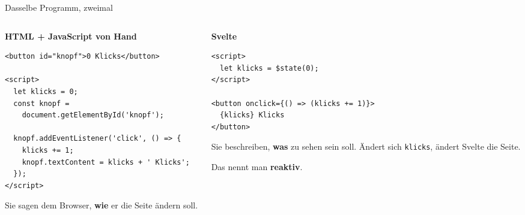 \begin{frame}[fragile]{Dasselbe Programm, zweimal}
  \begin{columns}[onlytextwidth,t]
    \begin{column}{0.49\textwidth}
      \textbf{HTML + JavaScript von Hand}
\begin{lstlisting}[style=svelte]
<button id="knopf">0 Klicks</button>

<script>
  let klicks = 0;
  const knopf =
    document.getElementById('knopf');

  knopf.addEventListener('click', () => {
    klicks += 1;
    knopf.textContent = klicks + ' Klicks';
  });
</script>
\end{lstlisting}
      \footnotesize Sie sagen dem Browser, \textbf{wie} er die Seite ändern soll.
    \end{column}
    \begin{column}{0.47\textwidth}
      \textbf{Svelte}
\begin{lstlisting}[style=svelte]
<script>
  let klicks = $state(0);
</script>

<button onclick={() => (klicks += 1)}>
  {klicks} Klicks
</button>
\end{lstlisting}
      \footnotesize Sie beschreiben, \textbf{was} zu sehen sein soll.
      Ändert sich \texttt{klicks}, ändert Svelte die Seite.

      \vspace{0.5em}
      \itemArrowLine Das nennt man \textbf{reaktiv}.
    \end{column}
  \end{columns}
\end{frame}

